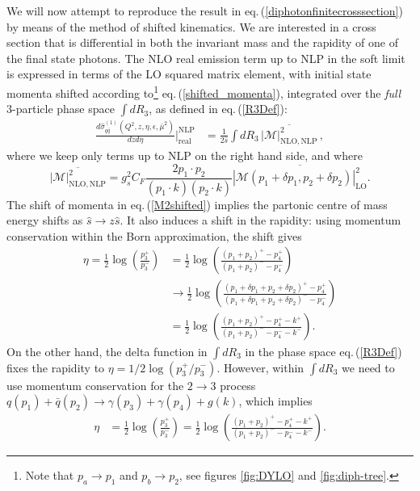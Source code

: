 \documentclass[11pt]{article}
\newcommand{\M}{\mathcal{M}}
\newcommand\eqn[1]     {eq.\,(\ref{#1})}
\begin{document}
We will now attempt to reproduce the 
result in \eqn{diphotonfinitecrosssection} by means of the 
method of shifted kinematics. We are interested in a cross 
section that is differential in both the invariant mass and 
the rapidity of one of the final state photons. The NLO real emission term up to 
NLP in the soft limit is expressed in terms of the LO squared 
matrix element, with initial state momenta shifted 
according to\footnote{Note that  $p_a \to p_1$ and $p_b \to p_2$, 
see figures \ref{fig:DYLO} 
and \ref{fig:diph-tree}.} \eqn{shifted_momenta}, integrated
over the \emph{full} 3-particle phase space $\int dR_3$, as 
defined in \eqn{R3Def}:
\begin{align}\label{eq:NLOShift}
\frac{d\hat{\sigma}_{q\bar{q}}^{(1)}(Q^2,z,\eta,\epsilon,\bar\mu^2)}{dzd\eta}\bigg|_{\text{real}}^{\text{NLP}} &= \frac{1}{2\hat s}
\int dR_3 \, \overline{\left|\M\right|^2_{\mathrm{NLO, NLP}}}\,,
\end{align}
where we keep only terms up to NLP on the right hand side, and where
\begin{equation}\label{M2shifted}
\overline{\left|\M\right|^2_{\mathrm{NLO, NLP}}} = g_s^2C_F\frac{2p_1\cdot p_2}{(p_1\cdot k)(p_2\cdot k)}
\overline{\left|\M(p_1+\delta p_1,p_2+\delta p_2)\right|_\text{LO}^2}.
\end{equation}
The shift of momenta in \eqn{M2shifted} implies 
the partonic centre of mass energy shifts as $\hat{s}\to z\hat{s}$. It also induces a shift 
in the rapidity: using momentum conservation within 
the Born approximation, the shift gives
\begin{align}\label{eq:etashift}
\eta = \frac{1}{2}\log\left(\frac{p_3^+}{p_3^-}\right)
&=\frac12\log\left(\frac{(p_1+p_2)^+-p_4^+}{(p_1+p_2)^--p_4^-}\right) \nonumber \\
&\to\frac12\log\left(\frac{(p_1+\delta p_1+p_2+\delta p_2)^+-p_4^+}{(p_1+\delta p_1+p_2+\delta p_2)^--p_4^-}\right) \nonumber \\ 
&=\frac12\log\left(\frac{(p_1+p_2)^+-p_4^+-k^+}{(p_1+p_2)^--p_4^--k^-}\right).
\end{align}
On the other hand, the delta function in $\int dR_3$
in the phase space \eqn{R3Def} fixes the rapidity to 
$\eta = 1/2\log\left(p_3^+/p_3^-\right)$. However,
within $\int dR_3$ we need to use momentum 
conservation for the $2\to 3$ process 
$q(p_1) + \bar{q}(p_2) \rightarrow \gamma(p_3) + \gamma(p_4) + g(k)$, which implies 
\begin{align}\label{eq:etaNLO}
\eta &= \frac{1}{2}\log\left(\frac{p_3^+}{p_3^-}\right)
= \frac12\log\left(\frac{(p_1+p_2)^+-p_4^+-k^+}{(p_1+p_2)^--p_4^--k^-}\right).
\end{align}
\end{document}
